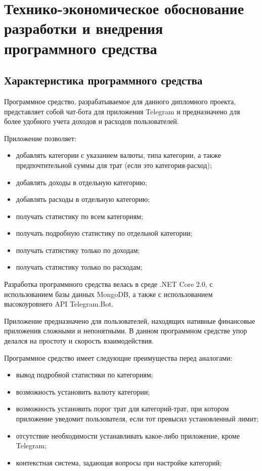 

\setcounter{page}{2}

\section{Технико-экономическое обоснование разработки и внедрения программного средства}
\label{sec:economics}

\subsection{Характеристика программного средства}
\label{sec:economics:description}

Программное средство, разрабатываемое для данного дипломного проекта, представляет собой чат-бота для приложения Telegram и предназначено для более удобного учета доходов и расходов пользователей.

Приложение позволяет:

\begin{itemize}
	\item добавлять категории с указанием валюты, типа категории, а также предпочтительной суммы для трат (если это категория-расход);
	\item добавлять доходы в отдельную категорию;
	\item добавлять расходы в отдельную категорию;
	\item получать статистику по всем категориям;
	\item получать подробную статистику по отдельной категории;
	\item получать статистику только по доходам;
	\item получать статистику только по расходам;
\end{itemize}

Разработка программного средства велась в среде .NET Core 2.0, с использованием базы данных MongoDB, а также с использованием высокоуровнего API Telegram.Bot.

Приложение предназначено для пользователей, находящих нативные финансовые приложения сложными и непонятными. В данном программном средстве упор делался на простоту и скорость взаимодействия.

Программное средство имеет следующие преимущества перед аналогами:

\begin{itemize}
	\item вывод подробной статистики по категориям;
	\item возможность установить валюту категории;
	\item возможность установить порог трат для категорий-трат, при котором приложение уведомит пользователя, если тот превысил установленный лимит;
	\item отсутствие необходимости устанавливать какое-либо приложение, кроме Telegram;
	\item контекстная система, задающая вопросы при настройке категорий;
\end{itemize}

